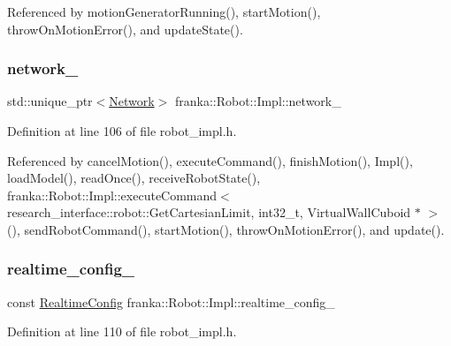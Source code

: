 Referenced by motion\+Generator\+Running(), start\+Motion(), throw\+On\+Motion\+Error(), and update\+State().

\mbox{\label{classfranka_1_1Robot_1_1Impl_acecf3b158ccd1c2ed7e76971f1e6a192}} 
\subsubsection{\texorpdfstring{network\+\_\+}{network\_}}
{\footnotesize\ttfamily std\+::unique\+\_\+ptr$<$\hyperlink{classfranka_1_1Network}{Network}$>$ franka\+::\+Robot\+::\+Impl\+::network\+\_\+\hspace{0.3cm}{\ttfamily [private]}}



Definition at line 106 of file robot\+\_\+impl.\+h.



Referenced by cancel\+Motion(), execute\+Command(), finish\+Motion(), Impl(), load\+Model(), read\+Once(), receive\+Robot\+State(), franka\+::\+Robot\+::\+Impl\+::execute\+Command$<$ research\+\_\+interface\+::robot\+::\+Get\+Cartesian\+Limit, int32\+\_\+t, Virtual\+Wall\+Cuboid $\ast$ $>$(), send\+Robot\+Command(), start\+Motion(), throw\+On\+Motion\+Error(), and update().

\mbox{\label{classfranka_1_1Robot_1_1Impl_af740b3f1aca49659f5d81501f3c83cad}} 
\subsubsection{\texorpdfstring{realtime\+\_\+config\+\_\+}{realtime\_config\_}}
{\footnotesize\ttfamily const \hyperlink{namespacefranka_aeede4f4629390fea21ca5e5a35a8a943}{Realtime\+Config} franka\+::\+Robot\+::\+Impl\+::realtime\+\_\+config\+\_\+\hspace{0.3cm}{\ttfamily [private]}}



Definition at line 110 of file robot\+\_\+impl.\+h.



